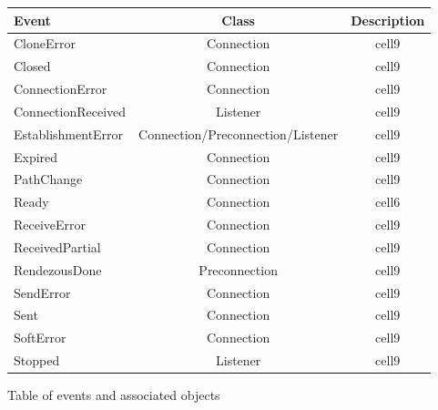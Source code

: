 \begin{figure}[H]
\begin{center}
\begin{tabular}{ ||l|c|c| } 
 \hline
 \textbf{Event}      & \textbf{Class}                    & \textbf{Description} \\ 
 \hline \hline
 CloneError          & Connection                        & cell9 \\ 
 \hline
 Closed              & Connection                        & cell9 \\ 
 \hline
 ConnectionError     & Connection                        & cell9 \\ 
 \hline
 ConnectionReceived  & Listener                          & cell9 \\ 
 \hline
 EstablishmentError  & Connection/Preconnection/Listener & cell9 \\ 
 \hline
 Expired             & Connection                        & cell9 \\ 
 \hline
 PathChange          & Connection                        & cell9 \\ 
 \hline
 Ready               & Connection                        & cell6 \\ 
 \hline
 ReceiveError        & Connection                        & cell9 \\ 
 \hline
 ReceivedPartial     & Connection                        & cell9 \\ 
 \hline
 RendezousDone       & Preconnection                     & cell9 \\ 
 \hline
 SendError           & Connection                        & cell9 \\ 
 \hline
 Sent                & Connection                        & cell9 \\ 
 \hline
 SoftError           & Connection                        & cell9 \\ 
 \hline
 Stopped             & Listener                          & cell9 \\ 
 \hline
\end{tabular}
\end{center}
\caption{Table of events and associated objects}
\label{fig:tapsEvents}
\end{figure}
